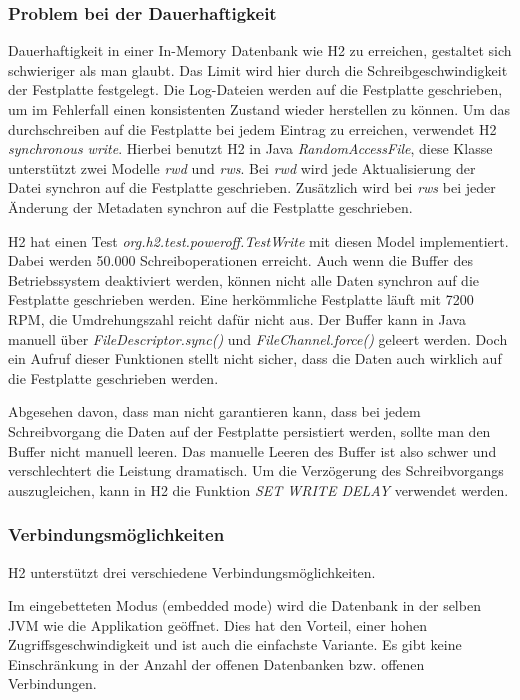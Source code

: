 \documentclass[draft,final]{vutinfth} %
\begin{document}
\subsubsection*{Problem bei der Dauerhaftigkeit}
Dauerhaftigkeit in einer In-Memory Datenbank wie H2 zu erreichen, gestaltet sich schwieriger als man glaubt. Das Limit wird hier durch die Schreibgeschwindigkeit der Festplatte festgelegt. Die Log-Dateien werden auf die Festplatte geschrieben, um im Fehlerfall einen konsistenten Zustand wieder herstellen zu können. Um das durchschreiben auf die Festplatte bei jedem Eintrag zu erreichen, verwendet H2 \textit{synchronous write}. Hierbei benutzt H2 in Java \textit{RandomAccessFile}, diese Klasse unterstützt zwei Modelle \textit{rwd} und \textit{rws}. Bei \textit{rwd} wird jede Aktualisierung der Datei synchron auf die Festplatte geschrieben. Zusätzlich wird bei \textit{rws} bei jeder Änderung der Metadaten synchron auf die Festplatte geschrieben.

H2 hat einen Test \textit{org.h2.test.poweroff.TestWrite} mit diesen Model implementiert. Dabei werden 50.000 Schreiboperationen erreicht. Auch wenn die Buffer des Betriebssystem deaktiviert werden, können nicht alle Daten synchron auf die Festplatte geschrieben werden. Eine herkömmliche Festplatte läuft mit 7200 RPM, die Umdrehungszahl reicht dafür nicht aus. Der Buffer kann in Java manuell über \textit{FileDescriptor.sync()} und \textit{FileChannel.force()} geleert werden. Doch ein Aufruf dieser Funktionen stellt nicht sicher, dass die Daten auch wirklich auf die Festplatte geschrieben werden.

Abgesehen davon, dass man nicht garantieren kann, dass bei jedem Schreibvorgang die Daten auf der Festplatte persistiert werden, sollte man den Buffer nicht manuell leeren. Das manuelle Leeren des Buffer ist also schwer und verschlechtert die Leistung dramatisch. Um die Verzögerung des Schreibvorgangs auszugleichen, kann in H2 die Funktion \textit{SET WRITE DELAY} verwendet werden.


\subsubsection*{Verbindungsmöglichkeiten}
H2 unterstützt drei verschiedene Verbindungsmöglichkeiten. 

Im eingebetteten Modus (embedded mode) wird die Datenbank in der selben JVM wie die Applikation geöffnet. Dies hat den Vorteil, einer hohen Zugriffsgeschwindigkeit und ist auch die einfachste Variante. Es gibt keine Einschränkung in der Anzahl der offenen Datenbanken bzw. offenen Verbindungen.
\end{document}
